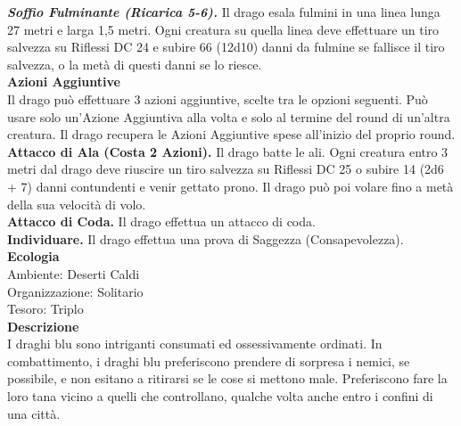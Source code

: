 \begin{multicols}{2}
\emph{\textbf{Soffio Fulminante (Ricarica 5-6).}} Il drago esala fulmini in una linea lunga 27 metri e larga 1,5 metri. Ogni creatura su quella linea deve effettuare un tiro salvezza su Riflessi DC  24 e subire 66 (12d10) danni da fulmine se fallisce il tiro salvezza, o la metà di questi danni se lo riesce.\\
\textbf{Azioni Aggiuntive}\\
Il drago può effettuare 3 azioni aggiuntive, scelte tra le opzioni seguenti. Può usare solo un'Azione Aggiuntiva alla volta e solo al termine del round di un'altra creatura. Il drago recupera le Azioni Aggiuntive spese all'inizio del proprio round.\\
\textbf{Attacco di Ala (Costa 2 Azioni).} Il drago batte le ali. Ogni creatura entro 3 metri dal drago deve riuscire un tiro salvezza su Riflessi DC  25 o subire 14 (2d6 + 7) danni contundenti e venir gettato prono. Il drago può poi volare fino a metà della sua velocità di volo.\\
\textbf{Attacco di Coda.} Il drago effettua un attacco di coda.\\
\textbf{Individuare.} Il drago effettua una prova di Saggezza (Consapevolezza).\\
\textbf{Ecologia}\\
Ambiente: Deserti Caldi\\
Organizzazione: Solitario\\
Tesoro: Triplo\\
\textbf{Descrizione}\\
I draghi blu sono intriganti consumati ed ossessivamente ordinati. In combattimento, i draghi blu preferiscono prendere di sorpresa i nemici, se possibile, e non esitano a ritirarsi se le cose si mettono male. Preferiscono fare la loro tana vicino a quelli che controllano, qualche volta anche entro i confini di una città.\\


\end{multicols}
